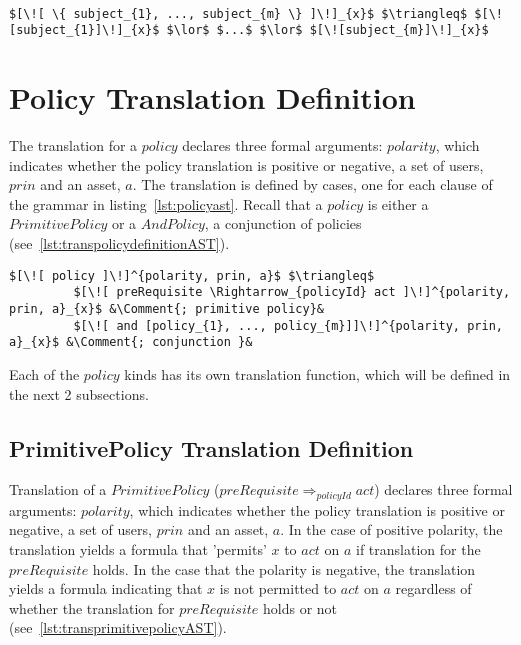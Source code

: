 \lstset{mathescape, language=AST}  
\begin{lstlisting}[frame=single, caption={Prin Translation Definition {$\colon$} List of subjects},label={lst:transprinListOfSubjects}]

$[\![ \{ subject_{1}, ..., subject_{m} \} ]\!]_{x}$ $\triangleq$ $[\![subject_{1}]\!]_{x}$ $\lor$ $...$ $\lor$ $[\![subject_{m}]\!]_{x}$

\end{lstlisting}

\section{Policy Translation Definition}
The translation for a $policy$ declares three formal arguments: $polarity$, which indicates whether the policy translation is positive or negative, a set of users, $prin$ and an asset, $a$.
The translation is defined by cases, one for each clause of the grammar in listing~\ref{lst:policyast}. Recall that a $policy$ is either a $PrimitivePolicy$ or a $AndPolicy$, a conjunction of policies (see~\ref{lst:transpolicydefinitionAST}).


\lstset{mathescape, language=AST}  
\begin{lstlisting}[frame=single, caption={Policy Translation Definition},label={lst:transpolicydefinitionAST}]
$[\![ policy ]\!]^{polarity, prin, a}$ $\triangleq$ 
         $[\![ preRequisite \Rightarrow_{policyId} act ]\!]^{polarity, prin, a}_{x}$ &\Comment{; primitive policy}&
         $[\![ and [policy_{1}, ..., policy_{m}]]\!]^{polarity, prin, a}_{x}$ &\Comment{; conjunction }&

\end{lstlisting}

Each of the $policy$ kinds has its own translation function, which will be defined in the next 2 subsections. 

\subsection{PrimitivePolicy Translation Definition}
Translation of a $PrimitivePolicy$ ($preRequisite \Rightarrow_{policyId} act$) declares three formal arguments: $polarity$, which indicates whether the policy translation is positive or negative, a set of users, $prin$ and an asset, $a$. In the case of positive polarity, the translation yields a formula that 'permits' $x$ to $act$ on $a$ if translation for the $preRequisite$ holds. In the case that the polarity is negative, the translation yields a formula indicating that $x$ is not permitted to $act$ on $a$ regardless of whether the translation for $preRequisite$ holds or not (see~\ref{lst:transprimitivepolicyAST}).

